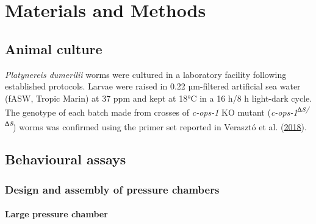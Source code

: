 \documentclass[
]{article}
\begin{document}
\hypertarget{materials-and-methods}{%
\section{Materials and Methods}\label{materials-and-methods}}

\hypertarget{animal-culture}{%
\subsection{Animal culture}\label{animal-culture}}

\emph{Platynereis dumerilii} worms were cultured in a laboratory
facility following established protocols. Larvae were raised in 0.22
µm-filtered artificial sea water (fASW, Tropic Marin) at 37 ppm and kept
at 18°C in a 16 h/8 h light-dark cycle. The genotype of each batch made
from crosses of \emph{c-ops-1} KO mutant
(\emph{c-ops-1\textsuperscript{∆8/∆8}}) worms was confirmed using the
primer set reported in Verasztó et al.
(\protect\hyperlink{ref-veraszto2018}{2018}).

\hypertarget{behavioural-assays}{%
\subsection{Behavioural assays}\label{behavioural-assays}}

\hypertarget{design-and-assembly-of-pressure-chambers}{%
\subsubsection{Design and assembly of pressure
chambers}\label{design-and-assembly-of-pressure-chambers}}

\hypertarget{large-pressure-chamber}{%
\paragraph{Large pressure chamber}\label{large-pressure-chamber}}
\end{document}
